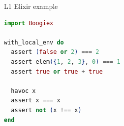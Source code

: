 \documentclass{beamer}
\begin{document}


  \begin{frame}[fragile]{L1 Elixir example}
    \small
    \begin{lstlisting}[language=elixir,numbers=none,frame=none]
import Boogiex

with_local_env do
  assert (false or 2) === 2
  assert elem({1, 2, 3}, 0) === 1
  assert true or true + true

  havoc x
  assert x === x
  assert not (x !== x)
end
    \end{lstlisting}
  \end{frame}
\end{document}
